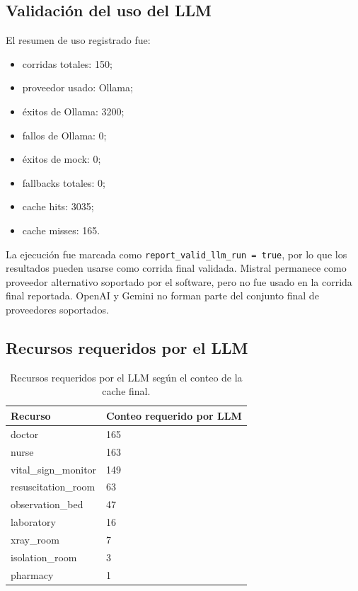\documentclass[12pt,a4paper]{article}
\begin{document}
\subsection{Validación del uso del LLM}

El resumen de uso registrado fue:

\begin{itemize}
    \item corridas totales: 150;
    \item proveedor usado: Ollama;
    \item éxitos de Ollama: 3200;
    \item fallos de Ollama: 0;
    \item éxitos de mock: 0;
    \item fallbacks totales: 0;
    \item cache hits: 3035;
    \item cache misses: 165.
\end{itemize}

La ejecución fue marcada como \texttt{report\_valid\_llm\_run = true}, por lo que los resultados pueden usarse como corrida final validada. Mistral permanece como proveedor alternativo soportado por el software, pero no fue usado en la corrida final reportada. OpenAI y Gemini no forman parte del conjunto final de proveedores soportados.

\subsection{Recursos requeridos por el LLM}

\begin{table}[H]
\centering
\begin{small}
\begin{tabular}{ll}
\toprule
Recurso & Conteo requerido por LLM \\
\midrule
doctor & 165 \\
nurse & 163 \\
vital\_sign\_monitor & 149 \\
resuscitation\_room & 63 \\
observation\_bed & 47 \\
laboratory & 16 \\
xray\_room & 7 \\
isolation\_room & 3 \\
pharmacy & 1 \\
\bottomrule
\end{tabular}
\end{small}
\caption{Recursos requeridos por el LLM según el conteo de la cache final.}
\label{tab:recursos-llm}
\end{table}
\end{document}
